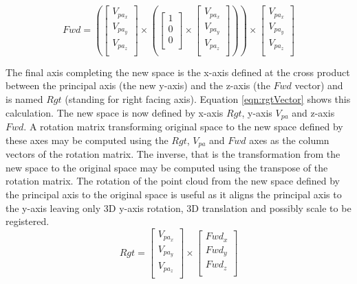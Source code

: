 \begin{equation} \label{eqn:fwdVector}
Fwd = \left(\left[
\begin{array}{c}
V_{pa_{x}}\\
V_{pa_{y}}\\
V_{pa_{z}}\\
\end{array}
\right] \times \left(\left[
\begin{array}{c}
1\\
0\\
0\\
\end{array}
\right] \times \left[
\begin{array}{c}
V_{pa_{x}}\\
V_{pa_{y}}\\
V_{pa_{z}}\\
\end{array}
\right]\right)\right) \times \left[
\begin{array}{c}
V_{pa_{x}}\\
V_{pa_{y}}\\
V_{pa_{z}}\\
\end{array}
\right]
\end{equation}

The final axis completing the new space is the x-axis defined at the cross product between the principal axis (the new y-axis) and the z-axis (the $Fwd$ vector) and is named $Rgt$ (standing for right facing axis). Equation \ref{eqn:rgtVector} shows this calculation. The new space is now defined by x-axis $Rgt$, y-axis $V_{pa}$ and z-axis $Fwd$. A rotation matrix transforming original space to the new space defined by these axes may be computed using the $Rgt$, $V_{pa}$ and $Fwd$ axes as the column vectors of the rotation matrix. The inverse, that is the transformation from the new space to the original space may be computed using the transpose of the rotation matrix. The rotation of the point cloud from the new space defined by the principal axis to the original space is useful as it aligns the principal axis to the y-axis leaving only 3D y-axis rotation, 3D translation and possibly scale to be registered. \\ 


\begin{equation} \label{eqn:rgtVector}
Rgt = \left[
\begin{array}{c}
V_{pa_{x}}\\
V_{pa_{y}}\\
V_{pa_{z}}\\
\end{array}
\right] \times \left[
\begin{array}{c}
Fwd_x\\
Fwd_y\\
Fwd_z\\
\end{array}
\right]
\end{equation}



